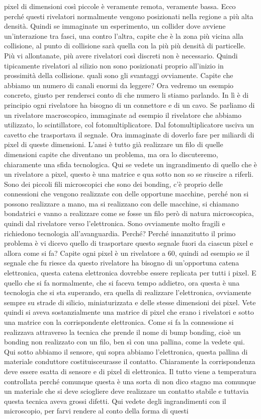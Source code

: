 pixel di dimensioni così piccole è veramente remota, veramente bassa. Ecco perché questi rivelatori normalmente vengono posizionati nella regione a più alta densità. Quindi se immaginate un esperimento, un collider dove avviene un'interazione tra fasci, una contro l'altra, capite che è la zona più vicina alla collisione, al punto di collisione sarà quella con la più più densità di particelle. Più vi allontanate, più avere rivelatori così discreti non è necessario. Quindi tipicamente rivelatori al silizio non sono posizionati proprio all'inizio in prossimità della collisione. quali sono gli svantaggi ovviamente. Capite che abbiamo un numero di canali enormi da leggere? Ora vedremo un esempio concreto, giusto per rendersci conto di che numero li stiamo parlando. In lì è di principio ogni rivelatore ha bisogno di un connettore e di un cavo. Se parliamo di un rivelatore macroscopico, immaginate ad esempio il rivelatore che abbiamo utilizzato, lo scintillatore, col fotomultiplicatore. Dal fotomultiplicatore usciva un cavetto che trasportava il segnale. Ora immaginate di doverlo fare per miliardi di pixel di queste dimensioni. L'ansi è tutto già realizzare un filo di quelle dimensioni capite che diventano un problema, ma ora lo discuteremo, chiaramente una sfida tecnologica. Qui se vedete un ingrandimento di quello che è un rivelatore a pixel, questo è una matrice e qua sotto non so se riuscire a riferli. Sono dei piccoli fili microscopici che sono dei bonding, c'è proprio delle connessioni che vengono realizzate con delle opportune macchine, perché non si possono realizzare a mano, ma si realizzano con delle macchine, si chiamano bondatrici e vanno a realizzare come se fosse un filo però di natura microscopica, quindi dal rivelatore verso l'elettronica. Sono ovviamente molto fragili e richiedono tecnologia all'avanguardia. Perché? Perché innanzitutto il primo problema è vi dicevo quello di trasportare questo segnale fuori da ciascun pixel e allora come si fa? Capite ogni pixel è un rivelatore a 60, quindi ad esempio se il segnale che fu riesce da questo rivelatore ha bisogno di un'opportuna catena elettronica, questa catena elettronica dovrebbe essere replicata per tutti i pixel. E quello che si fa normalmente, che si faceva tempo addietro, ora questa è una tecnologia che si sta superando, era quella di realizzare l'elettronica, ovviamente sempre su strade di silicio, miniaturizzata e delle stesse dimensioni dei pixel. Vete quindi si aveva sostanzialmente una matrice di pixel che erano i rivelatori e sotto una matrice con la corrispondente elettronica. Come si fa la connessione si realizzava attraverso la tecnica che prende il nome di bump bonding, cioè un bonding non realizzato con un filo, ben sì con una pallina, come la vedete qui. Qui sotto abbiamo il sensore, qui sopra abbiamo l'elettronica, questa pallina di materiale conduttore costituisceurasse il contatto. Chiaramente la corrispondenza deve essere esatta di sensore e di pixel di elettronica. Il tutto viene a temperatura controllata perché comunque questa è una sorta di non dico stagno ma comunque un materiale che si deve sciogliere deve realizzare un contatto stabile e tuttavia questa tecnica aveva grossi difetti. Qui vedete degli ingrandimenti con il microscopio, per farvi rendere al conto della forma di questi 